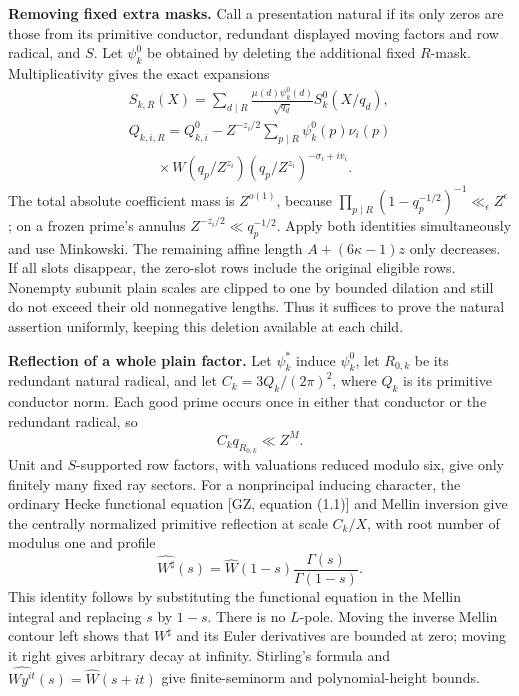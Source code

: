 \documentclass[11pt,a4paper]{article}
\begin{document}
\textbf{Removing fixed extra masks.} Call a presentation natural if its
only zeros are those from its primitive conductor, redundant displayed
moving factors and row radical, and \(S\). Let \(\psi_k^0\) be obtained
by deleting the additional fixed \(R\)-mask. Multiplicativity gives the
exact expansions \[
\begin{gathered}
S_{k,R}(X)=\sum_{d\mid R}\frac{\mu(d)\psi_k^0(d)}{\sqrt{q_d}}
 S_k^0(X/q_d),\\
Q_{k,i,R}=Q_{k,i}^0-Z^{-z_i/2}\sum_{p\mid R}\psi_k^0(p)\nu_i(p)\\[-1pt] \qquad{}\times W(q_p/Z^{z_i})(q_p/Z^{z_i})^{-\sigma_i+iv_i}.
\end{gathered}
\tag{B3.41}
\] The total absolute coefficient mass is \(Z^{o(1)}\), because
\(\prod_{p\mid R}(1-q_p^{-1/2})^{-1}\ll_\epsilon Z^\epsilon\); on a
frozen prime's annulus \(Z^{-z_i/2}\ll q_p^{-1/2}\). Apply both
identities simultaneously and use Minkowski. The remaining affine length
\(A+(6\kappa-1)z\) only decreases. If all slots disappear, the zero-slot
rows include the original eligible rows. Nonempty subunit plain scales
are clipped to one by bounded dilation and still do not exceed their old
nonnegative lengths. Thus it suffices to prove the natural assertion
uniformly, keeping this deletion available at each child.

\textbf{Reflection of a whole plain factor.} Let \(\psi_k^*\) induce
\(\psi_k^0\), let \(R_{0,\allowbreak{}k}\) be its redundant natural radical, and let
\(C_k=3Q_k/(2\pi)^2\), where \(Q_k\) is its primitive conductor norm.
Each good prime occurs once in either that conductor or the redundant
radical, so \[
C_kq_{R_{0,k}}\ll Z^M.
\tag{B3.42}
\] Unit and \(S\)-supported row factors, with valuations reduced modulo
six, give only finitely many fixed ray sectors. For a nonprincipal
inducing character, the ordinary Hecke functional equation {[}GZ,
equation (1.1){]} and Mellin inversion give the centrally normalized
primitive reflection at scale \(C_k/X\), with root number of modulus one
and profile \[
\widehat{W^\sharp}(s)=\widehat W(1-s)\frac{\Gamma(s)}{\Gamma(1-s)}.
\tag{B3.43}
\] This identity follows by substituting the functional equation in the
Mellin integral and replacing \(s\) by \(1-s\). There is no \(L\)-pole.
Moving the inverse Mellin contour left shows that \(W^\sharp\) and its
Euler derivatives are bounded at zero; moving it right gives arbitrary
decay at infinity. Stirling's formula and
\(\widehat{Wy^{it}}(s)=\widehat W(s+it)\) give finite-seminorm and
polynomial-height bounds.
\end{document}
